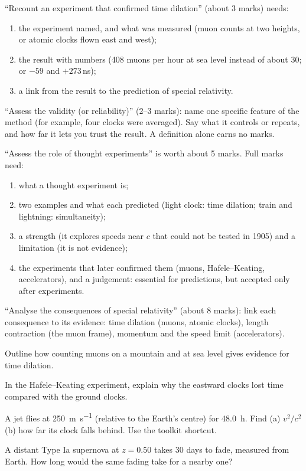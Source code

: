 \begin{examtip}
``Recount an experiment that confirmed time dilation'' (about 3 marks) needs:
\begin{enumerate}
  \item the experiment named, and what was measured (muon counts at two heights, or atomic
        clocks flown east and west);
  \item the result with numbers (408 muons per hour at sea level instead of about 30; or
        $-59$ and $+273$\,ns);
  \item a link from the result to the prediction of special relativity.
\end{enumerate}
``Assess the validity (or reliability)'' (2--3 marks): name one specific feature of the method
(for example, four clocks were averaged). Say what it controls or repeats, and how far it lets
you trust the result. A definition alone earns no marks.
\end{examtip}

\begin{examtip}
``Assess the role of thought experiments'' is worth about 5 marks. Full marks need:
\begin{enumerate}
  \item what a thought experiment is;
  \item two examples and what each predicted (light clock: time dilation; train and lightning:
        simultaneity);
  \item a strength (it explores speeds near $c$ that could not be tested in 1905) and a
        limitation (it is not evidence);
  \item the experiments that later confirmed them (muons, Hafele--Keating, accelerators), and
        a judgement: essential for predictions, but accepted only after experiments.
\end{enumerate}
``Analyse the consequences of special relativity'' (about 8 marks): link each consequence to
its evidence: time dilation (muons, atomic clocks), length contraction (the muon frame),
momentum and the speed limit (accelerators).
\end{examtip}

\begin{quickcheck}
  \item Outline how counting muons on a mountain and at sea level gives evidence for time
        dilation.
  \item In the Hafele--Keating experiment, explain why the eastward clocks lost time compared
        with the ground clocks.
  \item A jet flies at \qty{250}{m.s^{-1}} (relative to the Earth's centre) for \qty{48.0}{h}.
        Find (a) $v^2/c^2$ (b) how far its clock falls behind. Use the toolkit shortcut.
  \item A distant Type Ia supernova at $z = 0.50$ takes 30 days to fade, measured from Earth. How
        long would the same fading take for a nearby one?
\end{quickcheck}
